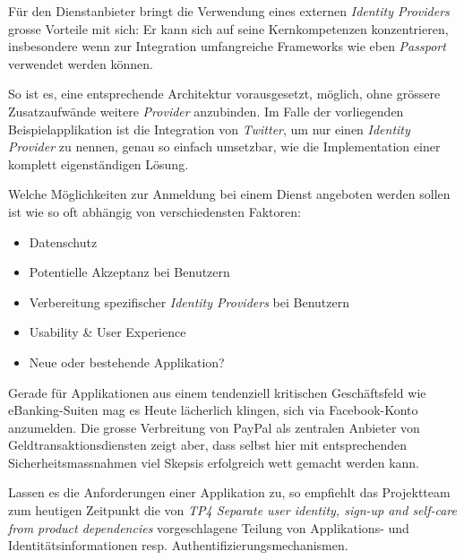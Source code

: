 Für den Dienstanbieter bringt die Verwendung eines externen \emph{Identity Providers} grosse Vorteile mit sich: Er kann sich auf seine Kernkompetenzen konzentrieren, insbesondere wenn zur Integration umfangreiche Frameworks wie eben \emph{Passport} verwendet werden können.

So ist es, eine entsprechende Architektur vorausgesetzt, möglich, ohne grössere Zusatzaufwände weitere \emph{Provider} anzubinden. Im Falle der vorliegenden Beispielapplikation ist die Integration von \emph{Twitter}, um nur einen \emph{Identity Provider} zu nennen, genau so einfach umsetzbar, wie die Implementation einer komplett eigenständigen Lösung.

Welche Möglichkeiten zur Anmeldung bei einem Dienst angeboten werden sollen ist wie so oft abhängig von verschiedensten Faktoren:

\begin{itemize}
	\item Datenschutz
	\item Potentielle Akzeptanz bei Benutzern
	\item Verbereitung spezifischer \emph{Identity Providers} bei Benutzern
	\item Usability \& User Experience
	\item Neue oder bestehende Applikation?
\end{itemize}

Gerade für Applikationen aus einem tendenziell kritischen Geschäftsfeld wie eBanking-Suiten mag es Heute lächerlich klingen, sich via Facebook-Konto anzumelden. Die grosse Verbreitung von PayPal \cite{paypal} als zentralen Anbieter von Geldtransaktionsdiensten zeigt aber, dass selbst hier mit entsprechenden Sicherheitsmassnahmen viel Skepsis erfolgreich wett gemacht werden kann.

Lassen es die Anforderungen einer Applikation zu, so empfiehlt das Projektteam zum heutigen Zeitpunkt die von \emph{TP4 Separate user identity, sign-up and self-care from product dependencies} vorgeschlagene Teilung von Applikations- und Identitätsinformationen resp. Authentifizierungsmechanismen.
